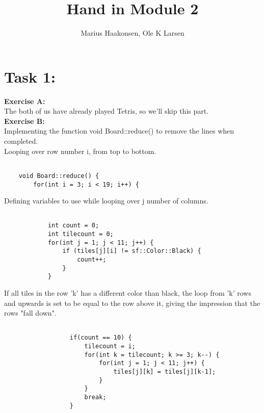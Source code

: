 \documentclass[11pt]{amsart}
\title{Hand in Module 2}
\author{Marius Haakonsen, Ole K Larsen}
\begin{document}
\maketitle

\section{Task 1:}

\textbf{Exercise A:}  \\
The both of us have already played Tetris, so we'll skip this part.  \\

\textbf{Exercise B:} \\

Implementing the function void Board::reduce() to remove the lines when completed. \\

Looping over row number i, from top to bottom. \\
\begin{verbatim}

	void Board::reduce() {
	    for(int i = 3; i < 19; i++) {

\end{verbatim}

Defining variables to use while looping over j number of columns. \\
\begin{verbatim}

	        int count = 0;
	        int tilecount = 0;
	        for(int j = 1; j < 11; j++) {
	            if (tiles[j][i] != sf::Color::Black) {
	                count++;
	            }
	        }

\end{verbatim}


If all tiles in the row 'k' has a different color than black, the loop from 'k' rows and upwards is set to be equal to the row above it, giving the impression that the rows "fall down". \\
\begin{verbatim}

	              if(count == 10) {
	                  tilecount = i;
	                  for(int k = tilecount; k >= 3; k--) {
	                      for(int j = 1; j < 11; j++) {
	                          tiles[j][k] = tiles[j][k-1];
	                      }
	                  }
	                  break;
	              }

\end{verbatim}
\end{document}
